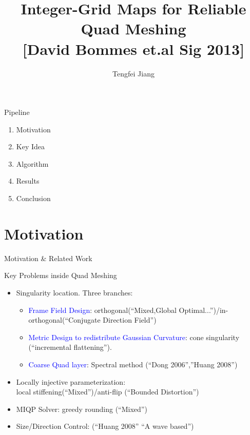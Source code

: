 \documentclass{beamer}
\begin{document}
\title{Integer-Grid Maps for Reliable Quad Meshing\\
\small{[David Bommes et.al Sig 2013]}}
\author{Tengfei Jiang}

\newcommand{\FPP}[2]{\frac{\partial #1}{\partial #2}}
\begin{frame}
  \titlepage
\end{frame}

\begin{frame}{Pipeline}
  \begin{enumerate}
    \item Motivation 
    \item Key Idea
    \item Algorithm
    \item Results
    \item Conclusion
  \end{enumerate}
\end{frame}

\section{Motivation}
\begin{frame}{Motivation \& Related Work}
\begin{block}{Key Problems inside Quad Meshing}
\begin{itemize}
\item Singularity location. Three branches:
  \begin{itemize}
    \item \textcolor{blue}{Frame Field Design}: orthogonal(``Mixed,Global Optimal...'')/in-orthogonal(``Conjugate Direction Field'')
    \item \textcolor{blue}{Metric Design to redistribute Gaussian Curvature}: cone singularity (``incremental flattening'').
    \item \textcolor{blue}{Coarse Quad layer}: Spectral method (``Dong 2006'',''Huang 2008'')
  \end{itemize}
\item Locally injective parameterization: \\local stiffening(``Mixed'')/anti-flip (``Bounded Distortion'')
\item MIQP Solver: greedy rounding (``Mixed'')
\item Size/Direction Control: (``Huang 2008'' ``A wave based'')
\end{itemize}
\end{block}
\end{frame}
\end{document}
